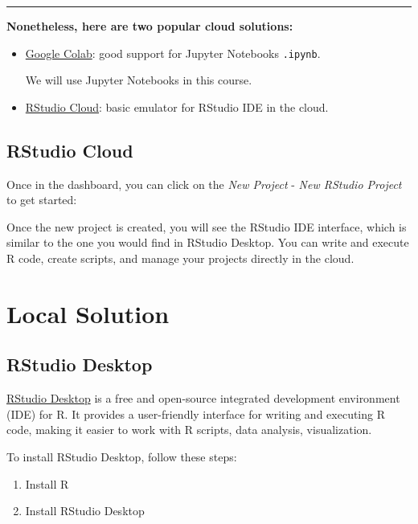 \documentclass[
  12pt,
  letterpaper,
]{scrbook}
\providecommand{\tightlist}{%
  \setlength{\itemsep}{0pt}\setlength{\parskip}{0pt}}
\renewcommand{\tightlist}{\setlength{\itemsep}{0.5\baselineskip}\setlength{\parskip}{0.2\baselineskip}}
\theoremstyle{definition}
\theoremstyle{plain}
\theoremstyle{remark}
\begin{document}
\begin{center}\rule{0.5\linewidth}{0.5pt}\end{center}

\textbf{Nonetheless, here are two popular cloud solutions:}

\begin{itemize}
\item
  \href{https://colab.research.google.com/}{Google Colab}: good support
  for Jupyter Notebooks \texttt{.ipynb}.

  We will use Jupyter Notebooks in this course.
\item
  \href{https://rstudio.cloud/}{RStudio Cloud}: basic emulator for
  RStudio IDE in the cloud.
\end{itemize}

\subsection{RStudio Cloud}\label{rstudio-cloud}

Once in the dashboard, you can click on the \emph{New Project} -
\emph{New RStudio Project} to get started:

Once the new project is created, you will see the RStudio IDE interface,
which is similar to the one you would find in RStudio Desktop. You can
write and execute R code, create scripts, and manage your projects
directly in the cloud.

\section{Local Solution}\label{local-solution}

\subsection{RStudio Desktop}\label{RStudio-Desktop}

\href{https://posit.co/download/rstudio-desktop/}{RStudio Desktop} is a
free and open-source integrated development environment (IDE) for R. It
provides a user-friendly interface for writing and executing R code,
making it easier to work with R scripts, data analysis, visualization.

To install RStudio Desktop, follow these steps:

\begin{enumerate}
\def\labelenumi{\arabic{enumi}.}
\tightlist
\item
  Install R
\item
  Install RStudio Desktop
\end{enumerate}
\end{document}
